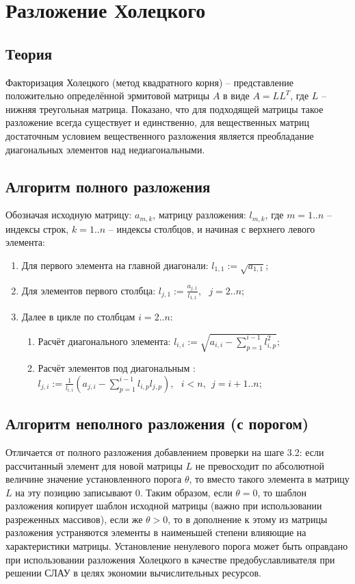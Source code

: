 \section{Разложение Холецкого}

\subsection{Теория}

Факторизация Холецкого (метод квадратного корня) -- представление положительно определённой эрмитовой матрицы $A$ в виде $A = LL^T$, где $L$ -- нижняя треугольная матрица. Показано, что для подходящей матрицы такое разложение всегда существует и единственно, для вещественных матриц достаточным условием вещественного разложения является преобладание диагональных элементов над недиагональными.

\subsection{Алгоритм полного разложения}

Обозначая исходную матрицу: $a_{m,k}$, матрицу разложения: $l_{m,k}$, где $m = 1..n$ -- индексы строк, $k=1..n$ -- индексы столбцов, и начиная с верхнего левого элемента:
\begin{enumerate}
    \item Для первого элемента на главной диагонали: $l_{1,1} := \sqrt{a_{1,1}}$;

    \item Для элементов первого столбца: $l_{j,1} := \frac{a_{j,1}}{l_{1,1}}, ~~~ j=2..n$;

    \item Далее в цикле по столбцам $i=2..n$:
    \begin{enumerate}
        \item Расчёт диагонального элемента: $l_{i,i} := \sqrt{a_{i,i} - \sum_{p=1}^{i-1}l_{i,p}^2}$;

        \item Расчёт элементов под диагональным : $l_{j,i} := \frac{1}{l_{i,i}}(a_{j,i} - \sum_{p=1}^{i-1}l_{i,p}l_{j,p}), ~~~ i<n,~~j=i+1..n$;
    \end{enumerate}
\end{enumerate}

\subsection{Алгоритм неполного разложения (с порогом)}
Отличается от полного разложения добавлением проверки на шаге 3.2: если рассчитанный элемент для новой матрицы $L$ не превосходит по абсолютной величине значение установленного порога $\theta$, то вместо такого элемента в матрицу $L$ на эту позицию записывают 0. Таким образом, если $\theta = 0$, то шаблон разложения копирует шаблон исходной матрицы (важно при использовании разреженных массивов), если же $\theta>0$, то в дополнение к этому из матрицы разложения устраняются элементы в наименьшей степени влияющие на характеристики матрицы. Установление ненулевого порога может быть оправдано при использовании разложения Холецкого в качестве предобуславливателя при решении СЛАУ в целях экономии вычислительных ресурсов.

